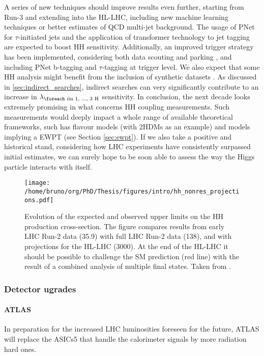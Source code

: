 \documentclass[11pt]{article}
\newcommand{\repeatn}[2]{\foreach \i in {1, ..., #1} {#2}}
\newcommand{\lh}[1]{\lambda_{\text{\repeatn{#1}{H}}}}
\newcommand{\run}[1]{Run-#1}
\begin{document}
A series of new techniques should improve results even further, starting from \run{3} and extending into the \ac{HL-LHC}, including new machine learning techniques or better estimates of \ac{QCD} multi-jet background.
The usage of \ac{PNet} \cite{particle_net} for \(\tau\)-initiated jets and the application of transformer technology to jet tagging \cite{particle_transformer} are expected to boost HH sensitivity.
Additionally, an improved trigger strategy has been implemented, considering both data scouting and parking \cite{parking_scouting_run3_cms}, and including \ac{PNet} b-tagging and \(\tau\)-tagging at trigger level.
We also expect that some HH analysis might benefit from the inclusion of synthetic datasets \cite{zz_zh_bbbb}.
As discussed in \cref{sec:indirect_searches}, indirect searches can very significantly contribute to an increase in \(\lh{3}\) sensitivity.
In conclusion, the next decade looks extremely promising in what concerns HH coupling measurements.
Such measurements would deeply impact a whole range of available theoretical frameworks, such has flavour models (with \acp{2HDM} as an example) and models implying a \ac{EWPT} (see Section \cref{sec:ewpt}).
If we also take a positive and historical stand, considering how \ac{LHC} experiments have consistently surpassed initial estimates, we can surely hope to be soon able to assess the way the Higgs particle interacts with itself.

\begin{figure}[htbp]
\centering
\texttt{[image: /home/bruno/org/PhD/Thesis/figures/intro/hh\_nonres\_projections.pdf]}
\caption{\label{fig:hh_nonres_projections}Evolution of the expected and observed upper limits on the HH production cross-section. The figure compares results from early \ac{LHC} \run{2} data (\SI{35.9}{\invfb}) with full \ac{LHC} \run{2} data (\SI{138}{\invfb}), and with projections for the \ac{HL-LHC} (\SI{3000}{\invfb}). At the end of the \ac{HL-LHC} it should be possible to challenge the \ac{SM} prediction (red line) with the result of a combined analysis of multiple final states. Taken from \cite{higgs_10_years}.}
\end{figure}
\subsubsection{Detector ugrades}
\label{sec:orga27aea7}
\label{sec:hllhc_detector_upgrades}

\paragraph{ATLAS}
In preparation for the increased LHC luminosities foreseen for the future, ATLAS will replace the ASICs5 that handle the calorimeter signals by more radiation hard ones. \cite{wigmans_new_developments}
\end{document}
